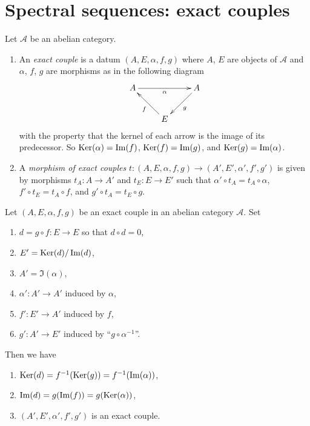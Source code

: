 \section{Spectral sequences: exact couples}
\label{section-exact-couple}

\begin{definition}
\label{definition-exact-couple}
Let $\mathcal{A}$ be an abelian category.
\begin{enumerate}
\item An {\it exact couple} is a datum $(A, E, \alpha, f, g)$ where
$A$, $E$ are objects of $\mathcal{A}$ and $\alpha$, $f$, $g$
are morphisms as in the following diagram
$$
\xymatrix{
A \ar[rr]_{\alpha} & & A \ar[ld]^g \\
& E \ar[lu]^f &
}
$$
with the property that the kernel of each arrow is the image
of its predecessor. So $\mathop{\mathrm{Ker}}(\alpha) = \mathop{\mathrm{Im}}(f)$,
$\mathop{\mathrm{Ker}}(f) = \mathop{\mathrm{Im}}(g)$, and $\mathop{\mathrm{Ker}}(g) = \mathop{\mathrm{Im}}(\alpha)$.
\item A {\it morphism of exact couples}
$t : (A, E, \alpha, f, g) \to (A', E', \alpha', f', g')$
is given by morphisms $t_A : A \to A'$ and
$t_E : E \to E'$ such that
$\alpha' \circ t_A = t_A \circ \alpha$,
$f' \circ t_E = t_A \circ f$, and
$g' \circ t_A = t_E \circ g$.
\end{enumerate}
\end{definition}

\begin{lemma}
\label{lemma-derived-exact-couple}
Let $(A, E, \alpha, f, g)$ be an exact couple in an abelian category
$\mathcal{A}$. Set
\begin{enumerate}
\item $d = g \circ f : E \to E$ so that $d \circ d = 0$,
\item $E' = \mathop{\mathrm{Ker}}(d)/\mathop{\mathrm{Im}}(d)$,
\item $A' = \Im(\alpha)$,
\item $\alpha' : A' \to A'$ induced by $\alpha$,
\item $f' : E' \to A'$ induced by $f$,
\item $g' : A' \to E'$ induced by ``$g \circ \alpha^{-1}$''.
\end{enumerate}
Then we have
\begin{enumerate}
\item $\mathop{\mathrm{Ker}}(d) = f^{-1}(\mathop{\mathrm{Ker}}(g)) = f^{-1}(\mathop{\mathrm{Im}}(\alpha))$,
\item $\mathop{\mathrm{Im}}(d) = g(\mathop{\mathrm{Im}}(f)) = g(\mathop{\mathrm{Ker}}(\alpha))$,
\item $(A', E', \alpha', f', g')$ is an exact couple.
\end{enumerate}
\end{lemma}

